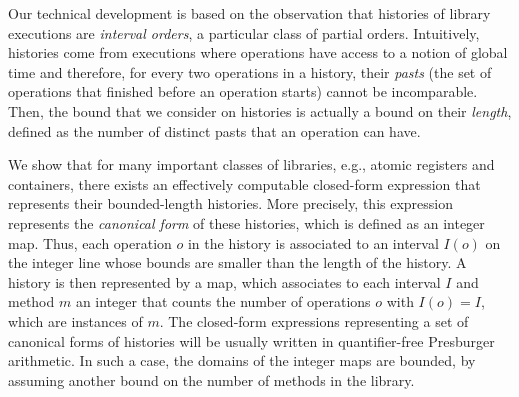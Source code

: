 

Our technical development is based on the observation that histories of library
executions are \emph{interval orders}, a particular class of partial orders.
Intuitively, histories come from executions where operations have access to a
notion of global time and therefore, for every two operations in a history,
their \emph{pasts} (the set of operations that finished before an operation
starts) cannot be incomparable. Then, the bound that we consider on histories
is actually a bound on their \emph{length}, defined as the number of distinct
pasts that an operation can have.

We show that for many important classes of libraries, e.g., atomic registers
and containers, there exists an effectively computable closed-form expression
that represents their bounded-length histories. More precisely, this expression
represents the \emph{canonical form} of these histories, which is defined as an
integer map. Thus, each operation $o$ in the history is associated to an
interval $I(o)$ on the integer line whose bounds are smaller than the length of
the history. A history is then represented by a map, which associates to each
interval $I$ and method $m$ an integer that counts the number of operations $o$
with $I(o)=I$, which are instances of $m$. The closed-form expressions
representing a set of canonical forms of histories will be usually written in
quantifier-free Presburger arithmetic. In such a case, the domains of the
integer maps are bounded, by assuming another bound on the number of methods in
the library.


